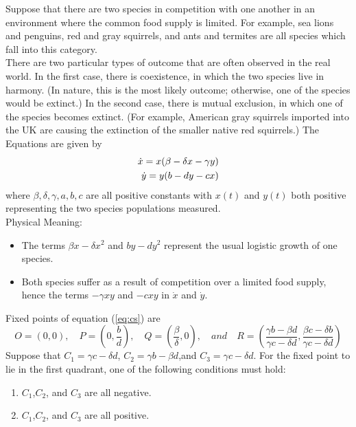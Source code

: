 Suppose that there are two species in competition with one another in an environment where the common food supply is limited.
For example, sea lions and penguins, red and gray squirrels, and ants and termites are all species which fall into this category.\\
There are two particular types of outcome that are often observed in the real world.
In the first case, there is coexistence, in which the two species live in harmony.
(In nature, this is the most likely outcome; otherwise, one of the species would be extinct.)
In the second case, there is mutual exclusion, in which one of the species becomes extinct. (For example, American gray squirrels imported into the UK are causing the extinction of the smaller native red squirrels.)
The Equations are given by
\begin{equation}{\label{eq:cs}}
	\begin{aligned}
		\dot{x}=x(\beta-\delta x-\gamma y)\\
		\dot{y}=y(b-dy-cx)
	\end{aligned}
\end{equation}
where $\beta,\delta,\gamma,a,b,c$ are all positive constants with $x(t)$ and $y(t)$ both positive representing the two species populations measured.\\
Physical Meaning:
\begin{itemize}
	\item The terms $\beta x-\delta x^2$ and $by-dy^2$ represent the usual logistic growth of one species.
	\item Both species suffer as a result of competition over a limited food supply, hence the terms $-\gamma xy$ and $-cxy$ in $\dot{x}$ and $\dot{y}$.
\end{itemize}
Fixed points of equation (\ref{eq:cs}) are
\begin{equation}
	O=(0,0),\quad P=\left(0,\frac{b}{d}\right),\quad Q=\left(\frac{\beta}{\delta},0\right),\quad and\quad R=\left(\frac{\gamma b-\beta d}{\gamma c-\delta d},\frac{\beta c-\delta b}{\gamma c-\delta d}\right)
\end{equation}
Suppose that $C_1=\gamma c-\delta d$, $C_2=\gamma b-\beta d$,and $C_3=\gamma c-\delta d$.
For the fixed point to lie in the first quadrant, one of the following conditions must hold:
\begin{enumerate}[label=(\roman*)]
	\item $C_1$,$C_2$, and $C_3$ are all negative.
	\item $C_1$,$C_2$, and $C_3$ are all positive.
\end{enumerate}
